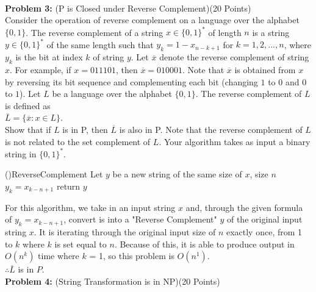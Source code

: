 \documentclass[11pt]{amsart}
\begin{document}
\newpage
\hrulefill \\
\textbf{Problem 3:} (P is Closed under Reverse Complement)\hfill (20 Points)\\

Consider the operation of reverse complement on a language over the alphabet $\{ 0, 1\}$. The reverse complement of a string $x \in \{ 0, 1 \}^*$ of length $n$ is a string $y \in \{ 0, 1 \}^*$ of the same length such that $y_k = 1 - x_{n-k+1}$ for $k = 1, 2, ..., n$, where $y_k$ is the bit at index $k$ of string $y$. Let $\overline{x}$ denote the reverse complement of string $x$. For example, if $x = 011101$, then $\overline{x} = 010001$. Note that $\overline{x}$ is obtained from  $x$ by reversing its bit sequence
and complementing each bit (changing $1$ to $0$ and $0$ to $1$). Let $L$ be a language over the alphabet $\{ 0, 1\}$. The reverse complement of $L$ is defined as \\

$\overline{L} = \{ \overline{x} : x \in L \}$. \\

Show that if $L$ is in P, then $\overline{L}$ is also in P. Note that the reverse complement of $L$ is not related to the set complement of $L$. Your algorithm takes as input a binary string in $\{ 0, 1 \}^*$.
\begin{algorithm}[H]
    \Fn(){ReverseComplement}{
    \SetAlgoLined
    \SetNoFillComment
    \DontPrintSemicolon
        Let $y$ be a new string of the same size of $x$, size $n$\\
         {
            $y_k = x_{k - n + 1}$
        }
        return $y$
    }
    \end{algorithm}
For this algorithm, we take in an input string $x$ and, through the given formula of $y_k = x_{k - n + 1}$, convert is into a "Reverse Complement" $y$ of the original input string $x$. It is iterating through the original input size of $n$ exactly once, from 1 to $k$ where $k$ is set equal to $n$. Because of this, it is able to produce output in $O(n^k)$ time where $k$ = 1, so this problem is $O(n^1)$.\\
$\therefore \overline{L}$ is in $P$.
\newpage
\hrulefill \\
\textbf{Problem 4:} (String Transformation is in NP)\hfill (20 Points)\\
\end{document}
